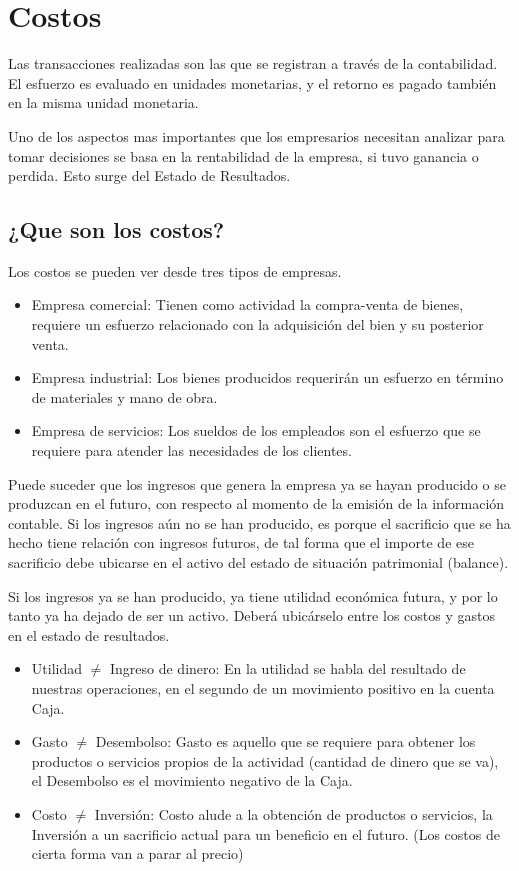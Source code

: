 \documentclass[titlepage,a4paper]{article}
\begin{document}
\section{Costos}
Las transacciones realizadas son las que se registran a través de la contabilidad. El
esfuerzo es evaluado en unidades monetarias, y el retorno es pagado también en la misma
unidad monetaria.

Uno de los aspectos mas importantes que los empresarios necesitan analizar para tomar decisiones se basa en la rentabilidad de la empresa, si tuvo ganancia o perdida. Esto surge del Estado de Resultados.


\subsection*{¿Que son los costos?}

Los costos se pueden ver desde tres tipos de empresas.
\begin{itemize}
    \item Empresa comercial: Tienen como actividad la compra-venta de bienes, requiere un esfuerzo relacionado con la adquisición del bien y su posterior venta.
    \item Empresa industrial: Los bienes producidos requerirán un esfuerzo en término de materiales y mano de obra.
    \item Empresa de servicios: Los sueldos de los empleados son el esfuerzo que se requiere para atender las necesidades de los clientes.
\end{itemize}

Puede suceder que los ingresos que genera la 
empresa ya se hayan producido o se produzcan en el futuro, con 
respecto al momento de la emisión de la información contable. Si los ingresos aún no se han producido, 
es porque el sacrificio que se ha hecho tiene relación con ingresos futuros, de tal forma que el importe 
de ese sacrificio debe ubicarse en el activo del estado de situación patrimonial (balance).

Si los ingresos ya se han producido, ya tiene utilidad económica futura, y por lo tanto ya ha dejado 
de ser un activo. Deberá ubicárselo entre los costos y gastos en el estado de resultados.

\begin{itemize}
    \item Utilidad $\neq$ Ingreso de dinero: En la utilidad se habla del resultado de nuestras operaciones, en el segundo de un movimiento positivo en la cuenta Caja.
    \item Gasto $\neq$ Desembolso: Gasto es aquello que se requiere para obtener los productos o servicios propios de la actividad (cantidad de dinero que se va), el Desembolso es el movimiento negativo de la Caja.
    \item Costo $\neq$ Inversión: Costo alude a la obtención de productos o servicios, la Inversión a un sacrificio actual para un beneficio en el futuro. (Los costos de cierta forma van a parar al precio)
\end{itemize}
\end{document}
